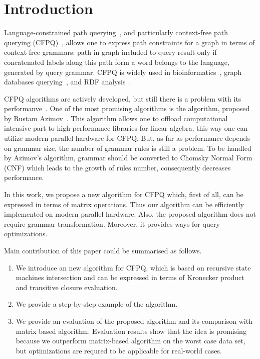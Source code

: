 \section{Introduction}

Language-constrained path querying~\cite{doi:10.1137/S0097539798337716}, and particularly context-free path querying (CFPQ)~\cite{Yannakakis}, allows one to express path constraints for a graph in terms of context-free grammars: path in graph  included to query result only if concatenated labels along this path form a word belongs to the language, generated by query grammar. CFPQ is widely used in bioinformatics~\cite{GraphQueryWithEarley}, graph databases querying~\cite{hellings2015querying,Medeiros:2018:EEC:3167132.3167265,10.1145/3335783.3335791}, and RDF analysis~\cite{RDF}. 

CFPQ algorithms are actively developed, but still there is a problem with its performanve~\cite{10.1145/3335783.3335791}.
One of the most promising algorithms is the algorithm, proposed by Rustam Azimov~\cite{Azimov:2018:CPQ:3210259.3210264}. 
This algorithm allows one to offload computational intensive part to high-performance libraries for linear algebra, this way one can utilize modern parallel hardware for CFPQ.
But, as far as performance depends on grammar size, the number of grammar rules  is still a problem. To be handled by Azimov's algorithm, grammar should be converted to Chomsky Normal Form (CNF) which leads to the growth of rules number, consequently decreases performance. 

In this work, we propose a new algorithm for CFPQ which, first of all, can be expressed in terms of matrix operations. Thus our algorithm can be efficiently implemented on modern parallel hardware. Also, the proposed algorithm does not require grammar transformation.  Moreover, it provides ways for query optimizations.


Main contribution of this paper could be summarised as follows.

\begin{enumerate}
\item We introduce an new algorithm for CFPQ, which is based on recursive state machines intersection and can be expressed in terms of Kronecker product and transitive closure evaluation.
\item We provide a step-by-step example of the algorithm.
\item We provide an evaluation of the proposed algorithm and its comparison with matrix based algorithm. Evaluation results show that the idea is promising because we outperform matrix-based algorithm on the worst case data set, but optimizations are requred to be applicable for real-world cases.
\end{enumerate}

